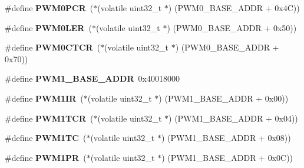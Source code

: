 \begin{DoxyCompactItemize}
\item 
\mbox{\label{group__lpc24xx__regs_gac7e239089765b3003891d7d32a3bc912}} 
\#define {\bfseries P\+W\+M0\+P\+CR}~($\ast$(volatile uint32\+\_\+t $\ast$) (P\+W\+M0\+\_\+\+B\+A\+S\+E\+\_\+\+A\+D\+DR + 0x4\+C))
\item 
\mbox{\label{group__lpc24xx__regs_ga9ec80d88d0ca9f70f15a0d2ce07892ed}} 
\#define {\bfseries P\+W\+M0\+L\+ER}~($\ast$(volatile uint32\+\_\+t $\ast$) (P\+W\+M0\+\_\+\+B\+A\+S\+E\+\_\+\+A\+D\+DR + 0x50))
\item 
\mbox{\label{group__lpc24xx__regs_gaa6ea274745d37a9bfd50f99d82203c82}} 
\#define {\bfseries P\+W\+M0\+C\+T\+CR}~($\ast$(volatile uint32\+\_\+t $\ast$) (P\+W\+M0\+\_\+\+B\+A\+S\+E\+\_\+\+A\+D\+DR + 0x70))
\item 
\mbox{\label{group__lpc24xx__regs_gaa7b965a863210c6c32c0d349d35809b7}} 
\#define {\bfseries P\+W\+M1\+\_\+\+B\+A\+S\+E\+\_\+\+A\+D\+DR}~0x40018000
\item 
\mbox{\label{group__lpc24xx__regs_gad4ec4390d18476c11ed41dd1c83f807e}} 
\#define {\bfseries P\+W\+M1\+IR}~($\ast$(volatile uint32\+\_\+t $\ast$) (P\+W\+M1\+\_\+\+B\+A\+S\+E\+\_\+\+A\+D\+DR + 0x00))
\item 
\mbox{\label{group__lpc24xx__regs_ga28c6d847018403ec9ba8df40e3c58943}} 
\#define {\bfseries P\+W\+M1\+T\+CR}~($\ast$(volatile uint32\+\_\+t $\ast$) (P\+W\+M1\+\_\+\+B\+A\+S\+E\+\_\+\+A\+D\+DR + 0x04))
\item 
\mbox{\label{group__lpc24xx__regs_gad58fea8768250165672ee7da3d15f8f5}} 
\#define {\bfseries P\+W\+M1\+TC}~($\ast$(volatile uint32\+\_\+t $\ast$) (P\+W\+M1\+\_\+\+B\+A\+S\+E\+\_\+\+A\+D\+DR + 0x08))
\item 
\mbox{\label{group__lpc24xx__regs_gaa7f831dfbad7be2667ef1129d679a404}} 
\#define {\bfseries P\+W\+M1\+PR}~($\ast$(volatile uint32\+\_\+t $\ast$) (P\+W\+M1\+\_\+\+B\+A\+S\+E\+\_\+\+A\+D\+DR + 0x0\+C))
\item 
\mbox{\label{group__lpc24xx__regs_gab18496b632150bed47a02eff3130f13a}} 

\end{DoxyCompactItemize}
